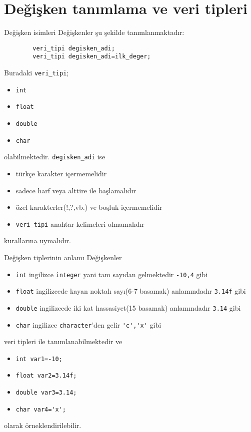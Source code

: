 \section{Değişken tanımlama ve veri tipleri}
\begin{frame}[fragile]{Değişken isimleri}
    Değişkenler şu şekilde tanımlanmaktadır:
    \begin{lstlisting}
        veri_tipi degisken_adi;
        veri_tipi degisken_adi=ilk_deger;\end{lstlisting}
    Buradaki \lstinline{veri_tipi};
    \begin{itemize}
        \item \lstinline{int} 
        \item \lstinline{float}
        \item \lstinline{double}
        \item \lstinline{char}
    \end{itemize}
     olabilmektedir. \lstinline{degisken_adi} ise 
    \begin{itemize}
     \item türkçe karakter içermemelidir
     \item sadece harf veya alttire ile başlamalıdır
     \item özel karakterler(!,?,vb.) ve boşluk içermemelidir
     \item \lstinline{veri_tipi} anahtar kelimeleri olmamalıdır
    \end{itemize}
    kurallarına uymalıdır.
\end{frame}
\begin{frame}[fragile]{Değişken tiplerinin anlamı}
    Değişkenler
    \begin{itemize}
     \item \lstinline{int} ingilizce \verb|integer| yani tam sayıdan gelmektedir \lstinline{-10,4} gibi
     \item \lstinline{float} ingilizcede kayan noktalı sayı(6-7 basamak) anlamındadır \lstinline{3.14f} gibi
     \item \lstinline{double} ingilizcede iki kat hassasiyet(15 basamak) anlamındadır \lstinline{3.14} gibi
     \item \lstinline{char} ingilizce \verb|character|'den gelir \lstinline{'c','x'} gibi
    \end{itemize}
    veri tipleri ile tanımlanabilmektedir ve 
    \begin{itemize}
        \item \lstinline{int var1=-10;} 
        \item \lstinline{float var2=3.14f;} 
        \item \lstinline{double var3=3.14;} 
        \item \lstinline{char var4='x';} 
    \end{itemize}
    olarak örneklendirilebilir.
\end{frame}
